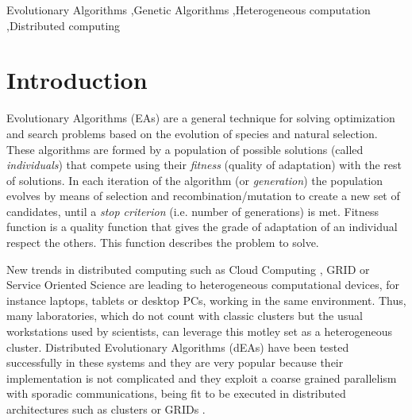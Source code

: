 \documentclass[final,1p,times]{elsarticle}
\begin{document}
\begin{frontmatter}
\begin{abstract}
\end{abstract}

\begin{keyword}
Evolutionary Algorithms \sep Genetic Algorithms \sep Heterogeneous computation \sep Distributed computing
\end{keyword}

\end{frontmatter}

\section{Introduction}
\label{sec:intro}


Evolutionary Algorithms (EAs) are a general technique for solving optimization and search problems based on the evolution of species and natural selection. These algorithms are formed by a population of possible solutions (called {\em individuals}) that compete using their {\em fitness} (quality of adaptation) with the rest of solutions. In each iteration of the algorithm (or {\em generation}) the population evolves by means of selection and recombination/mutation to create a new set of candidates, until a {\em stop criterion} (i.e. number of generations) is met. Fitness function is a quality function that gives the grade of adaptation of an individual respect the others. This function describes the problem to solve.

New trends in distributed computing such as Cloud Computing \cite{CLOUD}, GRID
\cite{OPENSCIENCEGRID} or Service Oriented Science \cite{GLOBUS} are
leading to heterogeneous computational devices, for instance laptops,
tablets or desktop PCs, working in the same
environment. Thus, many laboratories, which do not count with classic
clusters but the usual workstations used by scientists, can leverage
this motley set as a heterogeneous cluster. Distributed Evolutionary
Algorithms (dEAs) \cite{MULTIKULTI,PARALLELGRIDHETEROGENEOUS} have been tested successfully in these
systems and they are very popular because their implementation is
not complicated  %
 and they exploit a coarse grained parallelism with sporadic %
 communications, being fit to be executed in distributed architectures
 such as clusters or GRIDs \cite{PLATO}.%
\end{document}
